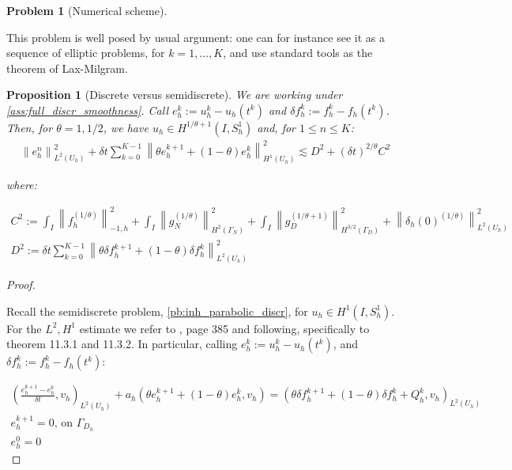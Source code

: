 \documentclass[english,a4paper,9pt,oneside]{scrbook}	%
\theoremstyle{break}
\newtheorem{prop}[equation]{Proposition}
\newtheorem{pb}[equation]{Problem}
\newenvironment{mproof}[1][\proofname]{%
  \begin{proof}[#1]$ $\par\nobreak\ignorespaces
}{%
  \end{proof}
}
\renewcommand*{\proofname}{Proof}
\theoremstyle{remark}
\newcommand{\ds}{\displaystyle}
\newcommand{\norm}[1]{\left\lVert#1\right\rVert}
\begin{document}
\begin{appendices}
\begin{pb}[Numerical scheme]
\end{pb}

This problem is well posed by usual argument: one can for instance see it as a sequence of elliptic problems, for $k = 1, ..., K$, and use standard tools as the theorem of Lax-Milgram.

\begin{prop}[Discrete versus semidiscrete]
\label{prop:d_vd_sd}
We are working under \cref{ass:full_discr_smoothness}.
Call $e_h^k:=u_h^k-u_h(t^k)$ and $\delta f_h^k:=f_h^k-f_h(t^k)$. Then, for $\theta=1, 1/2$, we have $u_h \in H^{1/\theta+1}(I, S^1_h)$ and, for $1\leq n \leq K$:
\begin{align*}
 \norm{e_{h}^{n}}_{L^2(U_h)}^2 + \delta t \sum_{k=0}^{K-1}\norm{\theta e_h^{k+1}+(1-\theta)e^k_h}_{H^1(U_h)}^2 \lesssim 
D^2 + (\delta t)^{2/\theta} C^2
\end{align*}

where:

\begin{align*}
C^2:=\ds \int_I \norm{f^{(1/\theta)}_h}_{-1,h}^2+\int_I\norm{ g_{N}^{(1/\theta)}}_{H^{2}(\Gamma_{N})}^2 + \int_I\norm{g_D^{(1/\theta+1)}}_{H^{3/2}(\Gamma_D)}^2 + \norm{\delta_{h}(0)^{(1/\theta)}}_{L^2(U_h)}^2\\
\ds D^2:= \ds {\delta t\sum_{k=0}^{K-1} \norm{\theta \delta f_h^{k+1}+(1-\theta)\delta f_h^k}_{L^2(U_h)}^2}
\end{align*}
\end{prop}


\begin{mproof}

Recall the semidiscrete problem, \cref{pb:inh_parabolic_discr}, for  $u_h \in H^1(I, S^1_h)$. For the $L^2, H^1$ estimate we refer to \cite{quarteroni}, page 385 and following, specifically to theorem 11.3.1 and 11.3.2. In particular, calling $e_h^k:=u_h^k-u_h(t^k)$, and $\delta f_h^k:=f_h^k-f_h(t^k)$:

\begin{align}
\label{eqn:discr_err}
\left ( \frac{e_{h}^{k+1}-e_h^k}{\delta t}, v_h\right)_{L^2(U_h)} + a_h(\theta e_h^{k+1}+(1-\theta)e^k_h, v_h) = (\theta \delta f_h^{k+1}+(1-\theta)\delta f_h^k + Q_h^k, v_h)_{L^2(U_h)} \\
e_h^{k+1}=0  \text{,  on } \Gamma_{D_h}\\
e_h^0=0
\end{align}


\end{mproof}
\end{appendices}
\end{document}
